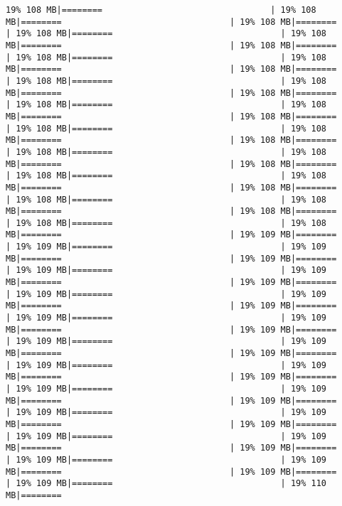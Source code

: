 \documentclass[
]{article}
\begin{document}
\begin{verbatim}
19% 108 MB|========                                 | 19% 108 MB|========                                 | 19% 108 MB|========                                 | 19% 108 MB|========                                 | 19% 108 MB|========                                 | 19% 108 MB|========                                 | 19% 108 MB|========                                 | 19% 108 MB|========                                 | 19% 108 MB|========                                 | 19% 108 MB|========                                 | 19% 108 MB|========                                 | 19% 108 MB|========                                 | 19% 108 MB|========                                 | 19% 108 MB|========                                 | 19% 108 MB|========                                 | 19% 108 MB|========                                 | 19% 108 MB|========                                 | 19% 108 MB|========                                 | 19% 108 MB|========                                 | 19% 108 MB|========                                 | 19% 108 MB|========                                 | 19% 108 MB|========                                 | 19% 108 MB|========                                 | 19% 108 MB|========                                 | 19% 108 MB|========                                 | 19% 108 MB|========                                 | 19% 108 MB|========                                 | 19% 108 MB|========                                 | 19% 108 MB|========                                 | 19% 109 MB|========                                 | 19% 109 MB|========                                 | 19% 109 MB|========                                 | 19% 109 MB|========                                 | 19% 109 MB|========                                 | 19% 109 MB|========                                 | 19% 109 MB|========                                 | 19% 109 MB|========                                 | 19% 109 MB|========                                 | 19% 109 MB|========                                 | 19% 109 MB|========                                 | 19% 109 MB|========                                 | 19% 109 MB|========                                 | 19% 109 MB|========                                 | 19% 109 MB|========                                 | 19% 109 MB|========                                 | 19% 109 MB|========                                 | 19% 109 MB|========                                 | 19% 109 MB|========                                 | 19% 109 MB|========                                 | 19% 109 MB|========                                 | 19% 109 MB|========                                 | 19% 109 MB|========                                 | 19% 109 MB|========                                 | 19% 109 MB|========                                 | 19% 109 MB|========                                 | 19% 109 MB|========                                 | 19% 109 MB|========                                 | 19% 109 MB|========                                 | 19% 109 MB|========                                 | 19% 109 MB|========                                 | 19% 109 MB|========                                 | 19% 110 MB|========      
\end{verbatim}
\end{document}
